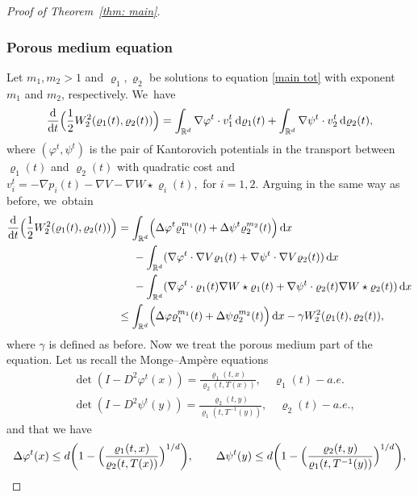 \documentclass[JEP,XML,SOM,Unicode,published]{cedram}
\newcommand{\Bprt}[1]{\Bigl(#1\Bigr)}
\newcommand{\bbprt}[1]{\biggl(#1\biggr)}
\newcommand{\dx}[1]{\mathop{}\!\mathrm{d} #1}
\newcommand{\ddt}{\frac{\dx{}}{\dx{t}}}
\newcommand{\R}{\mathbb{R}}
\theoremstyle{plain}
\theoremstyle{remark}
\begin{document}
\begin{proof}[Proof of Theorem~\ref{thm: main}]
\subsubsection*{Porous medium equation}
Let $m_1, m_2>1$ and $\varrho_1, \varrho_2$ be solutions to equation \eqref{main tot} with exponent $m_1$ and $m_2$, respectively. We~have\vspace*{-3pt}
\begin{equation*}
\ddt \Bprt{\frac 12 W_2^2(\varrho_1(t), \varrho_2(t))} = \int_{\R^d} \nabla \varphi^t \cdot v_1^t \dx{\varrho_1(t)} + \int_{\R^d} \nabla \psi^t \cdot v^t_2 \dx{\varrho_2(t)},
\end{equation*}
where $(\varphi^t, \psi^t)$ is the pair of Kantorovich potentials in the transport between $\varrho_1(t)$ and $\varrho_2(t)$ with quadratic cost and $v_i^t = -\nabla p_i(t) - \nabla V - \nabla W \star \varrho_i(t),$ for $i=1,2$.
Arguing in the same way as before, we~obtain\vspace*{-5pt}
\begin{align*}\label{dt W2 pme}
\ddt \Bprt{\frac 12 W_2^2(\varrho_1(t), \varrho_2(t))} &= \int_{\R^d} \Bprt{\Delta \varphi^t \varrho_1^{m_1}(t) +\Delta \psi^t \varrho_2^{m_2}(t) }\dx x\\
&\hspace*{.5cm} - \int_{\R^d} (\nabla \varphi^t \cdot \nabla V \varrho_1(t) + \nabla \psi^t \cdot \nabla V \varrho_2(t)) \dx x\\
&\hspace*{.5cm} - \int_{\R^d} (\nabla \varphi^t \cdot \varrho_1(t)\nabla W\star \varrho_1(t) +\nabla \psi^t \cdot \varrho_2(t)\nabla W\star \varrho_2(t) ) \dx x\\
&\leq \int_{\R^d} \Bprt{\Delta \varphi \varrho_1^{m_1}(t) +\Delta \psi \varrho_2^{m_2}(t) }\dx x -\gamma W_2^2(\varrho_1(t),\varrho_2(t)),
\end{align*}
where $\gamma$ is defined as before.
Now we treat the porous medium part of the equation.
Let us recall the Monge--Ampère equations\vspace*{-3pt}
\begin{align*}
&\det (I - D^2 \varphi^t(x)) = \frac{\varrho_1(t,x)}{\varrho_2(t,T (x))}, \quad \varrho_1(t)-a.e. \\[-3pt]
&\det (I - D^2 \psi^t(y)) = \frac{\varrho_2(t,y)}{\varrho_1(t,T^{-1}(y))}, \quad \varrho_2(t)-a.e.,
\end{align*}
and that we have
\[
\Delta \varphi^t(x)\leq d\bbprt{1-\Bprt{\frac{\varrho_1(t,x)}{\varrho_2(t,T(x))}}^{1/d}}, \qquad\Delta \psi^t(y)\leq d\bbprt{1-\Bprt{\frac{\varrho_2(t,y)}{\varrho_1(t,T^{-1}(y))}}^{1/d}},
\]
\end{proof}
\end{document}
